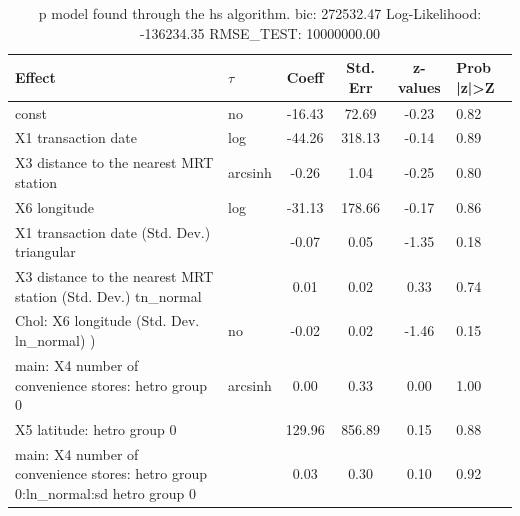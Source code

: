 \begin{table}
	\caption{p model found through the hs algorithm. bic: 272532.47 Log-Likelihood: -136234.35 RMSE_TEST: 10000000.00}
	\begin{center}
		\begin{tabular}{|l|l|c|c|c|l|}
			\hline
			Effect & $\tau$ & Coeff & Std. Err & z-values & Prob |z|>Z \\
			\hline
			const & no & -16.43 & 72.69 & -0.23 & 0.82 \\
			\hline
			X1 transaction date & log & -44.26 & 318.13 & -0.14 & 0.89 \\
			\hline
			X3 distance to the nearest MRT station & arcsinh & -0.26 & 1.04 & -0.25 & 0.80 \\
			\hline
			X6 longitude & log & -31.13 & 178.66 & -0.17 & 0.86 \\
			\hline
			X1 transaction date (Std. Dev.) triangular &  & -0.07 & 0.05 & -1.35 & 0.18 \\
			\hline
			X3 distance to the nearest MRT station (Std. Dev.) tn_normal &  & 0.01 & 0.02 & 0.33 & 0.74 \\
			\hline
			 Chol: X6 longitude (Std. Dev. ln_normal) ) & no & -0.02 & 0.02 & -1.46 & 0.15 \\
			\hline
			main: X4 number of convenience stores: hetro group 0 & arcsinh & 0.00 & 0.33 & 0.00 & 1.00 \\
			\hline
			X5 latitude: hetro group 0 &  & 129.96 & 856.89 & 0.15 & 0.88 \\
			\hline
			main: X4 number of convenience stores: hetro group 0:ln_normal:sd  hetro group 0 &  & 0.03 & 0.30 & 0.10 & 0.92 \\
			\hline
		\end{tabular}
	\end{center}
\end{table}